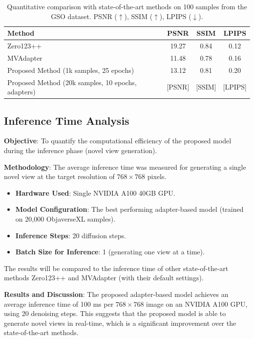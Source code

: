 \begin{table}[htbp]
  \centering
  \caption{Quantitative comparison with state-of-the-art methods on 100 samples from the GSO dataset. PSNR ($\uparrow$), SSIM ($\uparrow$), LPIPS ($\downarrow$).}
  \label{tab:sota_comparison_gso}
  \begin{tabular}{lccc}
    \toprule
    \textbf{Method} & \textbf{PSNR} & \textbf{SSIM} & \textbf{LPIPS} \\
    \midrule
    Zero123++ \cite{zero123} & 19.27 & 0.84 & 0.12 \\
    MVAdapter \cite{mvadapter} & 11.48 & 0.78 & 0.16 \\
    Proposed Method (1k samples, 25 epochs) & 13.12 & 0.81 & 0.20 \\
    Proposed Method (20k samples, 10 epochs, adapters) & [PSNR] & [SSIM] & [LPIPS] \\ %
    \bottomrule
  \end{tabular}
\end{table}

\subsection{Inference Time Analysis}\label{ssec:exp_inference_time}
\textbf{Objective}: To quantify the computational efficiency of the proposed model during the inference phase (novel view generation).

\textbf{Methodology}:
The average inference time was measured for generating a single novel view at the target resolution of $768 \times 768$ pixels.
\begin{itemize}
  \item \textbf{Hardware Used}: Single NVIDIA A100 40GB GPU.
  \item \textbf{Model Configuration}: The best performing adapter-based model (trained on 20,000 ObjaverseXL samples).
  \item \textbf{Inference Steps}: 20 diffusion steps.
  \item \textbf{Batch Size for Inference}: 1 (generating one view at a time).
\end{itemize}

The results will be compared to the inference time of other state-of-the-art methods Zero123++ \cite{zero1to3} and MVAdapter \cite{mvadapter} (with their default settings).

\textbf{Results and Discussion}: The proposed adapter-based model achieves an average inference time of 100 ms per $768 \times 768$ image on an NVIDIA A100 GPU, using 20 denoising steps. This suggests that the proposed model is able to generate novel views in real-time, which is a significant improvement over the state-of-the-art methods.

